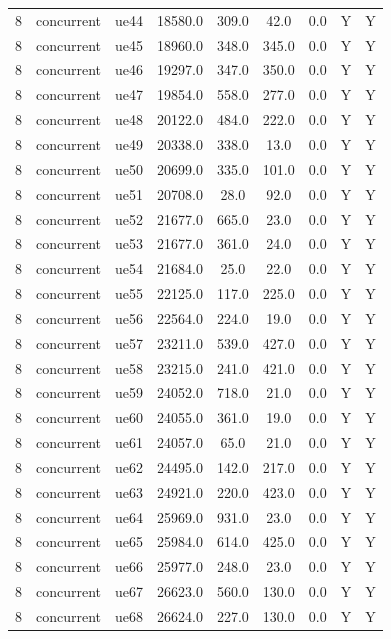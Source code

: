 \begin{table}[ht]
\begin{tabular}{|c|c|c|c|c|c|c|c|c|}
8 & concurrent & ue44 & 18580.0 & 309.0 & 42.0 & 0.0 & Y & Y \\
8 & concurrent & ue45 & 18960.0 & 348.0 & 345.0 & 0.0 & Y & Y \\
8 & concurrent & ue46 & 19297.0 & 347.0 & 350.0 & 0.0 & Y & Y \\
8 & concurrent & ue47 & 19854.0 & 558.0 & 277.0 & 0.0 & Y & Y \\
8 & concurrent & ue48 & 20122.0 & 484.0 & 222.0 & 0.0 & Y & Y \\
8 & concurrent & ue49 & 20338.0 & 338.0 & 13.0 & 0.0 & Y & Y \\
8 & concurrent & ue50 & 20699.0 & 335.0 & 101.0 & 0.0 & Y & Y \\
8 & concurrent & ue51 & 20708.0 & 28.0 & 92.0 & 0.0 & Y & Y \\
8 & concurrent & ue52 & 21677.0 & 665.0 & 23.0 & 0.0 & Y & Y \\
8 & concurrent & ue53 & 21677.0 & 361.0 & 24.0 & 0.0 & Y & Y \\
8 & concurrent & ue54 & 21684.0 & 25.0 & 22.0 & 0.0 & Y & Y \\
8 & concurrent & ue55 & 22125.0 & 117.0 & 225.0 & 0.0 & Y & Y \\
8 & concurrent & ue56 & 22564.0 & 224.0 & 19.0 & 0.0 & Y & Y \\
8 & concurrent & ue57 & 23211.0 & 539.0 & 427.0 & 0.0 & Y & Y \\
8 & concurrent & ue58 & 23215.0 & 241.0 & 421.0 & 0.0 & Y & Y \\
8 & concurrent & ue59 & 24052.0 & 718.0 & 21.0 & 0.0 & Y & Y \\
8 & concurrent & ue60 & 24055.0 & 361.0 & 19.0 & 0.0 & Y & Y \\
8 & concurrent & ue61 & 24057.0 & 65.0 & 21.0 & 0.0 & Y & Y \\
8 & concurrent & ue62 & 24495.0 & 142.0 & 217.0 & 0.0 & Y & Y \\
8 & concurrent & ue63 & 24921.0 & 220.0 & 423.0 & 0.0 & Y & Y \\
8 & concurrent & ue64 & 25969.0 & 931.0 & 23.0 & 0.0 & Y & Y \\
8 & concurrent & ue65 & 25984.0 & 614.0 & 425.0 & 0.0 & Y & Y \\
8 & concurrent & ue66 & 25977.0 & 248.0 & 23.0 & 0.0 & Y & Y \\
8 & concurrent & ue67 & 26623.0 & 560.0 & 130.0 & 0.0 & Y & Y \\
8 & concurrent & ue68 & 26624.0 & 227.0 & 130.0 & 0.0 & Y & Y \\

\end{tabular}
\end{table}
